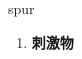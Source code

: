 
\begin{frame}
{\huge spur}
\begin{center}
\begin{enumerate}\Large
  \item \textbf{刺激物}
\end{enumerate}
\end{center}
\end{frame}
